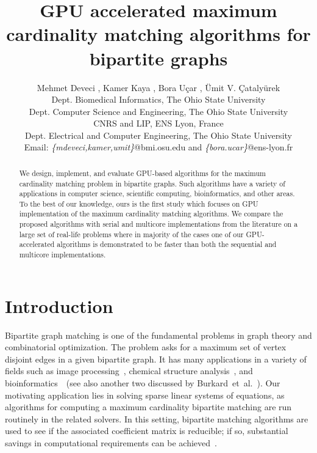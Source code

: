 \documentclass[11pt,a4paper]{article}
\begin{document}
\title{GPU accelerated maximum cardinality matching algorithms for bipartite graphs}




\author{
Mehmet Deveci ,
Kamer Kaya ,
Bora U\c car ,
\"{U}mit V. \c{C}ataly\"{u}rek  \\
  { Dept. Biomedical Informatics, The Ohio State University}\\
  { Dept. Computer Science and  Engineering, The Ohio State University}\\
  { CNRS and LIP, ENS Lyon, France}\\
  { Dept. Electrical and Computer Engineering, The Ohio State
    University}\\
  Email: {\textit{\{mdeveci,kamer,umit\}}@bmi.osu.edu and \textit{\{bora.ucar\}}@ens-lyon.fr}\\
}





\maketitle



\begin{abstract}
We design, implement, and evaluate GPU-based algorithms for the 
maximum cardinality matching problem in bipartite graphs.
Such algorithms 
have a variety of applications in computer science, scientific
computing, bioinformatics, and other areas.
To the best of our knowledge,
ours is the first study which focuses on GPU implementation of the maximum cardinality matching algorithms.
We compare
the proposed algorithms with serial and multicore implementations
from the literature on a large set of real-life problems where in
majority of the cases one of our GPU-accelerated algorithms is demonstrated to
be faster than both the sequential and multicore implementations.
\end{abstract}

\section{Introduction}
Bipartite graph matching is one of the fundamental problems in graph theory and combinatorial optimization.
The problem asks for a maximum set of vertex disjoint edges in a given bipartite graph.
It has many applications in a variety of fields such as image processing~\cite{kika:91}, chemical structure analysis~\cite{josz:95}, and
bioinformatics~\cite{azad2012multithreaded}~(see also another two discussed by Burkard~et~al.~\cite[Section 3.8]{budm:09}). Our motivating application lies in solving sparse linear 
systems of equations, as algorithms for computing a maximum cardinality bipartite matching are run routinely in the related solvers. In this setting, bipartite matching algorithms are used to see if the associated coefficient matrix is reducible; if so, substantial savings in computational requirements can be achieved~\cite[Chapter 6]{duer:86}.
 
\end{document}
